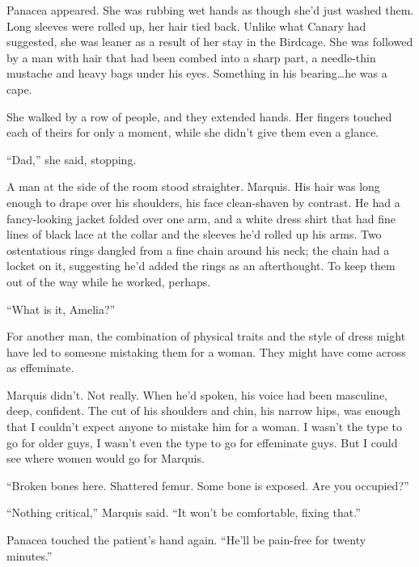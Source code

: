 Panacea appeared.  She was rubbing wet hands as though she'd just washed them.  Long sleeves were rolled up, her hair tied back.  Unlike what Canary had suggested, she was leaner as a result of her stay in the Birdcage.  She was followed by a man with hair that had been combed into a sharp part, a needle-thin mustache and heavy bags under his eyes.  Something in his bearing\ldots he was a cape.



She walked by a row of people, and they extended hands.  Her fingers touched each of theirs for only a moment, while she didn't give them even a glance.



``Dad,'' she said, stopping.



A man at the side of the room stood straighter.  Marquis.  His hair was long enough to drape over his shoulders, his face clean-shaven by contrast.  He had a fancy-looking jacket folded over one arm, and a white dress shirt that had fine lines of black lace at the collar and the sleeves he'd rolled up his arms.  Two ostentatious rings dangled from a fine chain around his neck; the chain had a locket on it, suggesting he'd added the rings as an afterthought.  To keep them out of the way while he worked, perhaps.



``What is it, Amelia?''



For another man, the combination of physical traits and the style of dress might have led to someone mistaking them for a woman.  They might have come across as effeminate.



Marquis didn't.  Not really.  When he'd spoken, his voice had been masculine, deep, confident.  The cut of his shoulders and chin, his narrow hips, was enough that I couldn't expect anyone to mistake him for a woman.  I wasn't the type to go for older guys, I wasn't even the type to go for effeminate guys.  But I could see where women would go for Marquis.



``Broken bones here.  Shattered femur.  Some bone is exposed.  Are you occupied?''



``Nothing critical,'' Marquis said.  ``It won't be comfortable, fixing that.''



Panacea touched the patient's hand again.  ``He'll be pain-free for twenty minutes.''



